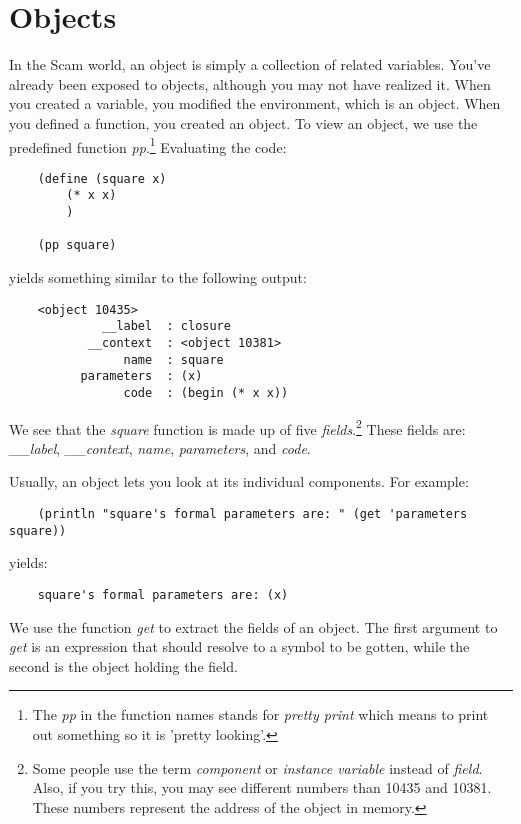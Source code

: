 \chapter{Objects}
\label{Objects}

In the Scam world, an object is simply a collection of related variables.
You've already been exposed to objects, although you may not
have realized it. When you created a variable, you modified
the environment, which is an object. When you defined a
function, you created 
an object. To view an object, we use the predefined function
{\it pp}.\footnote{
The {\it pp} in the function names stands for {\it pretty print} which
means to print out something so it is 'pretty looking'.
} Evaluating the code:

\begin{verbatim}
    (define (square x)
        (* x x)
        )
    
    (pp square)
\end{verbatim}

yields something similar to the following output:

\begin{verbatim}
    <object 10435>
             __label  : closure
           __context  : <object 10381>
                name  : square
          parameters  : (x)
                code  : (begin (* x x))
\end{verbatim}

We see that the {\it square} function is made up of five {\it fields}.\footnote{
Some people use the term {\it component} or {\it instance variable} instead
of {\it field}.
Also, if you try this, you may see different numbers than 10435 and 10381.
These numbers represent the address of the object in memory.
}
These fields are: {\it \_\_label}, {\it \_\_context}, {\it name},
{\it parameters},
and {\it code}.

Usually, an object lets you look at its individual components.
For example:

\begin{verbatim}
    (println "square's formal parameters are: " (get 'parameters square))
\end{verbatim}

yields:

\begin{verbatim}
    square's formal parameters are: (x)
\end{verbatim}
    
We use the function {\it get} to extract
the fields of an object. The first argument to {\it get} is an expression that
should resolve to a symbol to be gotten,
while
the second is the object holding the field. 

